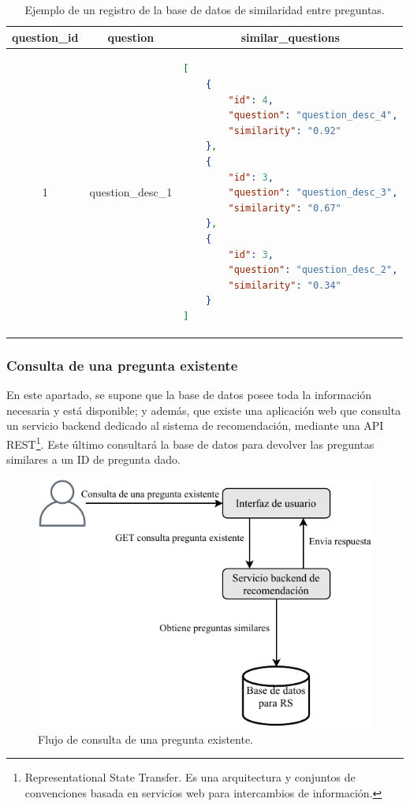 \begin{table}[h!]
	\centering
	\footnotesize
	\caption{Ejemplo de un registro de la base de datos de similaridad entre preguntas.}
	\begin{tabular}{|c|c|l|}
		\hline
		\textbf{question\_id} &
		\textbf{question} &
		\multicolumn{1}{c|}{\textbf{similar\_questions}} \\ \hline
		1 & question\_desc\_1 & \begin{lstlisting}[language=json]
[
	{
		"id": 4,
		"question": "question_desc_4",
		"similarity": "0.92"
	},
	{
		"id": 3,
		"question": "question_desc_3",
		"similarity": "0.67"
	},
	{
		"id": 3,
		"question": "question_desc_2",
		"similarity": "0.34"
	}
]
		\end{lstlisting} \\ \hline
	\end{tabular}
	\label{tab:table-similar-questions}
\end{table}

\subsubsection{Consulta de una pregunta existente}
En este apartado, se supone que la base de datos posee toda la información necesaria y está disponible; y además, que existe una aplicación web que consulta un servicio backend dedicado al sistema de recomendación, mediante una API REST\footnote{Representational State Transfer. Es una arquitectura y conjuntos de convenciones basada en servicios web para intercambios de información.}. Este último consultará la base de datos para devolver las preguntas similares a un ID de pregunta dado.

\begin{figure}[h!]
	\centering
	\includegraphics[width=0.6\linewidth]{8_problema_investigacion/imagenes/implementacion_rs_consulta}
	\caption{Flujo de consulta de una pregunta existente.}
	\label{fig:implementacionrsconsulta}
\end{figure}

